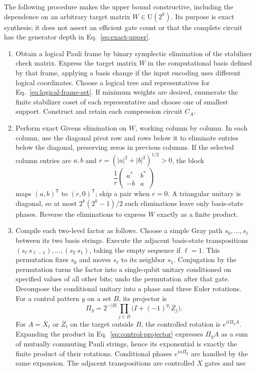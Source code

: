 \documentclass[aps,prl,reprint,notitlepage,nofootinbib,nobibnotes]{revtex4-2}
\newcommand{\UU}{\mathrm U}
\newcommand{\id}{I}
\begin{document}
The following procedure makes the upper bound constructive, including the dependence on an arbitrary target matrix \(W\in\UU(2^k)\). Its purpose is exact synthesis; it does not assert an efficient gate count or that the complete circuit has the generator depth in Eq.~\eqref{eq:exact-upper}.
\begin{enumerate}
\item Obtain a logical Pauli frame by binary symplectic elimination of the stabilizer check matrix. Express the target matrix \(W\) in the computational basis defined by that frame, applying a basis change if the input encoding uses different logical coordinates. Choose a logical tree and representatives for Eq.~\eqref{eq:logical-frame-set}. If minimum weights are desired, enumerate the finite stabilizer coset of each representative and choose one of smallest support. Construct and retain each compression circuit \(C_A\).
\item Perform exact Givens elimination on \(W\), working column by column. In each column, use the diagonal pivot row and rows below it to eliminate entries below the diagonal, preserving zeros in previous columns. If the selected column entries are \(a,b\) and \(r=(|a|^2+|b|^2)^{1/2}>0\), the block
\[
 \frac1r\begin{pmatrix}a^*&b^*\\-b&a\end{pmatrix}
\]
maps \((a,b)^\mathsf T\) to \((r,0)^\mathsf T\); skip a pair when \(r=0\). A triangular unitary is diagonal, so at most \(2^k(2^k-1)/2\) such eliminations leave only basis-state phases. Reverse the eliminations to express \(W\) exactly as a finite product.
\item Compile each two-level factor as follows. Choose a simple Gray path \(s_0,\ldots,s_\ell\) between its two basis strings. Execute the adjacent basis-state transpositions \((s_\ell\ s_{\ell-1}),\ldots,(s_2\ s_1)\), taking the empty sequence if \(\ell=1\). This permutation fixes \(s_0\) and moves \(s_\ell\) to its neighbor \(s_1\). Conjugation by the permutation turns the factor into a single-qubit unitary conditioned on specified values of all other bits; undo the permutation after that gate. Decompose the conditional unitary into a phase and three Euler rotations. For a control pattern \(y\) on a set \(B\), its projector is
\begin{equation}\label{eq:control-projector}
 \Pi_y=2^{-|B|}\prod_{j\in B}
        \bigl(\id+(-1)^{y_j}\overline Z_j\bigr).
\end{equation}
For \(A=\overline X_t\) or \(\overline Z_t\) on the target outside \(B\), the controlled rotation is \(e^{it\Pi_y A}\). Expanding the product in Eq.~\eqref{eq:control-projector} expresses \(\Pi_y A\) as a sum of mutually commuting Pauli strings, hence its exponential is exactly the finite product of their rotations. Conditional phases \(e^{i\alpha\Pi_y}\) are handled by the same expansion. The adjacent transpositions are controlled \(X\) gates and use

\end{enumerate}
\end{document}
